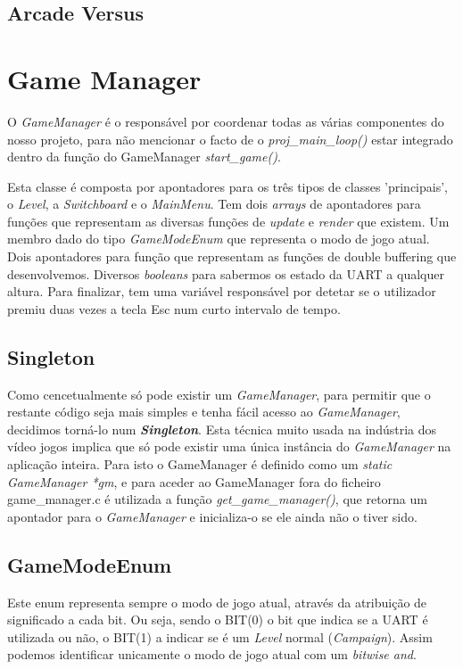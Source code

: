 \documentclass{report}
\begin{document}
\subsection{Arcade Versus}

\section{Game Manager}

O \textit{GameManager} é o responsável por coordenar todas as várias componentes do nosso projeto, para não mencionar o facto de o \textit{proj\_main\_loop()} estar integrado dentro da função do GameManager \textit{start\_game()}.

Esta classe é composta por apontadores para os três tipos de classes 'principais', o \textit{Level}, a \textit{Switchboard} e o \textit{MainMenu}. Tem dois \textit{arrays} de apontadores para funções que representam as diversas funções de \textit{update} e \textit{render} que existem. Um membro dado do tipo \textit{GameModeEnum} que representa o modo de jogo atual. Dois apontadores para função que representam as funções de double buffering que desenvolvemos. Diversos \textit{booleans} para sabermos os estado da UART a qualquer altura. Para finalizar, tem uma variável responsável por detetar se o utilizador premiu duas vezes a tecla Esc num curto intervalo de tempo.

\subsection{Singleton}

Como cencetualmente só pode existir um \textit{GameManager}, para permitir que o restante código seja mais simples e tenha fácil acesso ao \textit{GameManager}, decidimos torná-lo num \textbf{\textit{Singleton}}. Esta técnica muito usada na indústria dos vídeo jogos implica que só pode existir uma única instância do \textit{GameManager} na aplicação inteira. Para isto o GameManager é definido como um \textit{static GameManager *gm}, e para aceder ao GameManager fora do ficheiro game\_manager.c é utilizada a função \textit{get\_game\_manager()}, que retorna um apontador para o \textit{GameManager} e inicializa-o se ele ainda não o tiver sido.

\subsection{GameModeEnum}

Este enum representa sempre o modo de jogo atual, através da atribuição de significado a cada bit. Ou seja, sendo o BIT(0) o bit que indica se a UART é utilizada ou não, o BIT(1) a indicar se é um \textit{Level} normal (\textit{Campaign}). Assim podemos identificar unicamente o modo de jogo atual com um \textit{bitwise and}.
\end{document}
